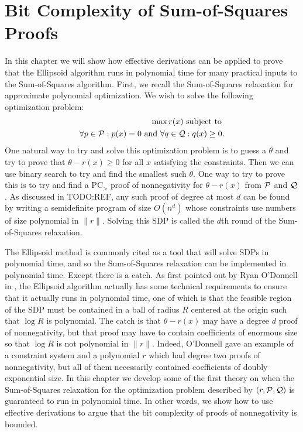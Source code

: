 \chapter{Bit Complexity of Sum-of-Squares Proofs}
In this chapter we will show how effective derivations can be applied to prove that the Ellipsoid algorithm runs in polynomial time for many practical inputs to the Sum-of-Squares algorithm. First, we recall the Sum-of-Squares relaxation for approximate polynomial optimization. We wish to solve the following optimization problem:
\begin{align*}
\max r(x)\text{ subject to } \\
\forall p \in \mathcal P: p(x) = 0 \text{ and } \forall q \in \mathcal Q: q(x) \geq 0.
\end{align*}
One natural way to try and solve this optimization problem is to guess a $\theta$ and try to prove that $\theta - r(x) \geq 0$ for all $x$ satisfying the constraints. Then we can use binary search to try and find the smallest such $\theta$. One way to try to prove this is to try and find a PC$_>$ proof of nonnegativity for $\theta - r(x)$ from $\mathcal P$ and $\mathcal Q$. As discussed in TODO:REF, any such proof of degree at most $d$ can be found by writing a semidefinite program of size $O(n^d)$ whose constraints use numbers of size polynomial in $\|r\|$. Solving this SDP is called the $d$th round of the Sum-of-Squares relaxation. 

The Ellipsoid method is commonly cited as a tool that will solve SDPs in polynomial time, and so the Sum-of-Squares relaxation can be implemented in polynomial time. Except there is a catch. As first pointed out by Ryan O'Donnell in \cite{}, the Ellipsoid algorithm actually has some technical requirements to ensure that it actually runs in polynomial time, one of which is that the feasible region of the SDP must be contained in a ball of radius $R$ centered at the origin such that $\log R$ is polynomial. The catch is that $\theta - r(x)$ may have a degree $d$ proof of nonnegativity, but that proof may have to contain coefficients of enormous size so that $\log R$ is not polynomial in $\|r\|$. Indeed, O'Donnell gave an example of a constraint system and a polynomial $r$ which had degree two proofs of nonnegativity, but all of them necessarily contained coefficients of doubly exponential size. In this chapter we develop some of the first theory on when the Sum-of-Squares relaxation for the optimization problem described by $(r,\mathcal P,\mathcal Q)$ is guaranteed to run in polynomial time. In other words, we show how to use effective derivations to argue that the bit complexity of proofs of nonnegativity is bounded. 

